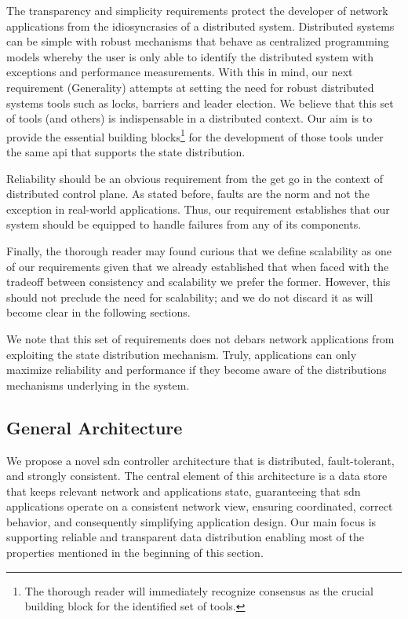 The transparency and simplicity requirements protect the developer of network applications from the 
idiosyncrasies of a distributed system. 
Distributed systems can be simple with robust mechanisms that behave
as centralized programming models whereby the user is only able to
identify the distributed system with exceptions and performance measurements. 
With this in mind, our next requirement (Generality) attempts at
setting the need for robust distributed systems tools such as locks,
barriers and leader election. We believe that this set of tools (and
others) is indispensable in a distributed context. Our aim  is to
provide the essential building blocks\footnote{The thorough reader
  will immediately recognize  consensus as the crucial building block
  for the identified set of tools.} for the development of those tools under the same \gls{api} that supports the state distribution.

Reliability should be an obvious requirement from the get go in the
context of distributed control plane. As stated before, faults are the
norm and not the exception in real-world applications.  Thus, our
requirement establishes that our system should be equipped to handle
failures from any of its components. 

Finally, the thorough reader may found curious that we define scalability as one of our requirements given that we already established that when faced with the tradeoff between consistency and scalability we prefer the former. 
However, this should not preclude the need for scalability; and we do not discard it as will become clear in the following sections. 


We note that this set of requirements does not debars network applications from exploiting the state distribution mechanism. Truly, applications can only maximize reliability and performance if they become aware of the distributions mechanisms underlying in the system. 




\subsection{General Architecture}
We propose a novel \gls{sdn} controller architecture that is distributed, fault-tolerant, and strongly consistent.
The central element of this architecture is a data store that keeps relevant network and applications state, guaranteeing that \gls{sdn} applications operate on a consistent network view, ensuring coordinated, correct behavior, and consequently simplifying application design.
Our main focus is supporting reliable and transparent  data distribution enabling  most of the properties mentioned in the beginning of this section. 


